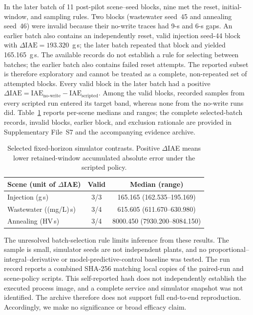 \documentclass[journal]{IEEEtran}
\begin{document}
In the later batch of 11 post-pilot scene--seed blocks, nine met the reset, initial-window, and sampling rules. Two blocks (wastewater seed~45 and annealing seed~46) were invalid because their no-write traces had 9-s and 6-s gaps. An earlier batch also contains an independently reset, valid injection seed-44 block with $\Delta\mathrm{IAE}=193.320$~g\,s; the later batch repeated that block and yielded 165.165~g\,s. The available records do not establish a rule for selecting between batches; the earlier batch also contains failed reset attempts. The reported subset is therefore exploratory and cannot be treated as a complete, non-repeated set of attempted blocks. Every valid block in the later batch had a positive $\Delta\mathrm{IAE}=\mathrm{IAE}_{\mathrm{no\text{-}write}}-\mathrm{IAE}_{\mathrm{scripted}}$. Among the valid blocks, recorded samples from every scripted run entered its target band, whereas none from the no-write runs did. Table~\ref{tab:selected-iae} reports per-scene medians and ranges; the complete selected-batch records, invalid blocks, earlier block, and exclusion rationale are provided in Supplementary File~S7 and the accompanying evidence archive.

\begin{table}[!t]
\centering
\caption{Selected fixed-horizon simulator contrasts. Positive $\Delta$IAE means lower retained-window accumulated absolute error under the scripted policy.}
\label{tab:selected-iae}
\footnotesize
\setlength{\tabcolsep}{3pt}
\begin{tabular}{@{}lcc@{}}
\toprule
Scene (unit of $\Delta$IAE) & Valid & Median (range) \\
\midrule
Injection (g\,s) & 3/3 & 165.165 (162.535--195.169) \\
Wastewater ((mg/L)\,s) & 3/4 & 615.605 (611.670--630.980) \\
Annealing (HV\,s) & 3/4 & 8000.450 (7930.200--8084.150) \\
\bottomrule
\end{tabular}
\end{table}

The unresolved batch-selection rule limits inference from these results. The sample is small, simulator seeds are not independent plants, and no proportional--integral--derivative or model-predictive-control baseline was tested. The run record reports a combined SHA-256 matching local copies of the paired-run and scene-policy scripts. This self-reported hash does not independently establish the executed process image, and a complete service and simulator snapshot was not identified. The archive therefore does not support full end-to-end reproduction. Accordingly, we make no significance or broad efficacy claim.
\end{document}
